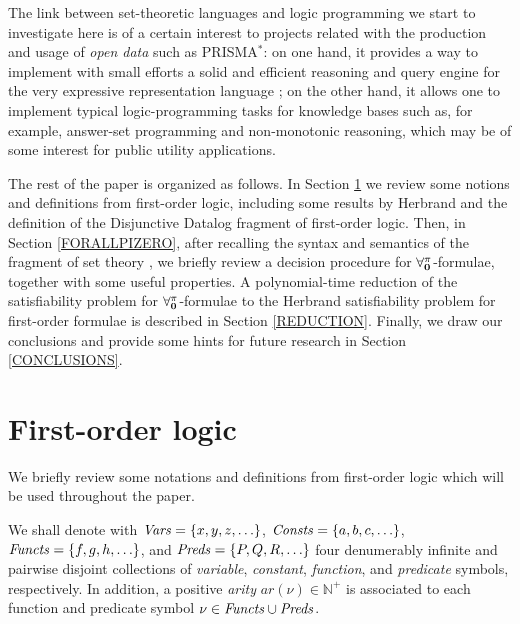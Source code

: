 \documentclass[manyauthors]{fundam}
\newcommand{\ar}{\mathit{ar}}
\newcommand{\nat}{\mathbb{N}}
\begin{document}
The link between set-theoretic languages and logic programming
we start to investigate here is of a certain interest to projects related
with the production and usage of \emph{open data} such as PRISMA$^{*}$:
on one hand, it provides a way to implement with small efforts a solid
and efficient reasoning and query engine for
the very expressive representation language \dlForallpizero; on the
other hand, it allows one to implement typical logic-programming tasks
for \dlForallpizero knowledge bases such as, for example,
answer-set programming and non-monotonic reasoning,
which may be of some interest for public utility applications.

The rest of the paper is organized as follows.  In Section
\ref{PRELIMINARIES} we review some notions and definitions from
first-order logic, including some results by
Herbrand and the definition of the Disjunctive Datalog
fragment of first-order logic.  Then, in Section \ref{FORALLPIZERO},
after recalling the syntax and semantics of the fragment of set theory
\Forallpizero, we briefly review a decision procedure for
$\mathbf{\forall_{0}^{\pi}}$-formulae, together with some useful properties.  A 
polynomial-time reduction of the satisfiability problem for
$\mathbf{\forall_{0}^{\pi}}$-formulae to the Herbrand satisfiability problem for
first-order formulae is described in Section \ref{REDUCTION}.
Finally, we draw our conclusions and provide some hints for future
research in Section \ref{CONCLUSIONS}.



\section{First-order logic}\label{PRELIMINARIES}


We briefly review some notations and definitions
from first-order logic which will be used throughout the
paper.

We shall denote with
$\mathit{Vars}=\{x, y, z, \ldots \}$, $\mathit{Consts}=\{a, b, c, \ldots \}$,
$\mathit{Functs}=\{f, g, h, \ldots \}$, and $\mathit{Preds}=\{P, Q, R, \ldots\}$
four denumerably infinite and pairwise disjoint collections
of \emph{variable}, \emph{constant}, \emph{function}, and \emph{predicate}
symbols, respectively.
In addition, a positive \emph{arity} $\ar(\nu) \in \nat^+$ is 
associated to each
function and predicate symbol $\nu \in \mathit{Functs} \cup \mathit{Preds}$.
%
%
\end{document}
